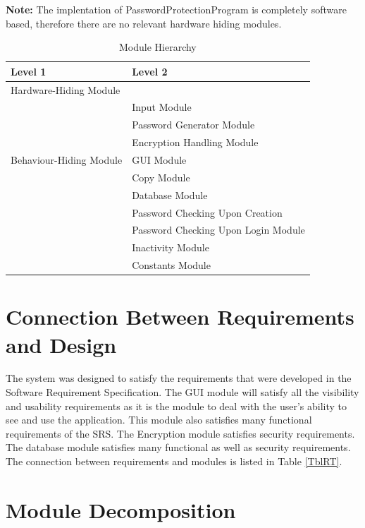 \documentclass[12pt, titlepage]{article}
\begin{document}
\textbf{Note:} The implentation of PasswordProtectionProgram is completely software based, therefore there are no relevant hardware hiding modules.

\begin{table}[h!]
\centering
\begin{tabular}{p{} p{}}
\toprule
\textbf{Level 1} & \textbf{Level 2}\\
\midrule

{Hardware-Hiding Module} & ~ \\
\midrule

\multirow{7}{0.3\textwidth}{Behaviour-Hiding Module} 
& Input Module\\
& Password Generator Module\\
& Encryption Handling Module\\
& GUI Module\\
& Copy Module\\
& Database Module\\ 
\midrule

\multirow{3}{0.3\textwidth}{Software Decision Module} 
& Password Checking Upon Creation\\
& Password Checking Upon Login Module\\
& Inactivity Module\\
& Constants Module\\
\bottomrule

\end{tabular}
\caption{Module Hierarchy}
\label{TblMH}
\end{table}

\section{Connection Between Requirements and Design} \label{SecConnection}

The system was designed to satisfy the requirements that were developed in the Software Requirement Specification. The GUI module will satisfy all the visibility and usability requirements as it is the module to deal with the user’s ability to see and use the application. This module also satisfies many functional requirements of the SRS. The Encryption module satisfies security requirements. The database module satisfies many functional as well as security requirements. The connection between requirements and modules is listed in Table \ref{TblRT}.

\section{Module Decomposition} \label{SecMD}
\end{document}
